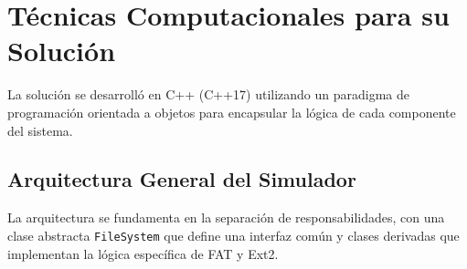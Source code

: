 \documentclass[12pt, a4paper]{article}
\begin{document}
\section{Técnicas Computacionales para su Solución}

La solución se desarrolló en C++ (C++17) utilizando un paradigma de programación orientada a objetos para encapsular la lógica de cada componente del sistema.

\subsection{Arquitectura General del Simulador}
La arquitectura se fundamenta en la separación de responsabilidades, con una clase abstracta \texttt{FileSystem} que define una interfaz común y clases derivadas que implementan la lógica específica de FAT y Ext2.
\end{document}

